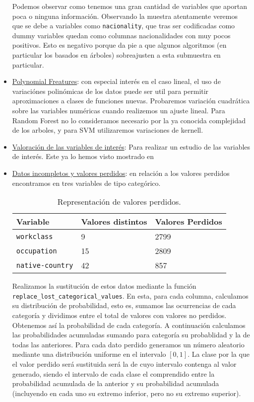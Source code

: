 \documentclass[11pt,a4paper]{article}
\begin{document}
\begin{itemize}
Podemos observar como tenemos una gran cantidad de variables que aportan poca o ninguna información. Observando la muestra atentamente veremos que se debe a variables como \texttt{nacionality}, que tras ser codificadas como dummy variables quedan como columnas nacionalidades con muy pocos positivos. Esto es negativo porque da pie a que algunos algoritmos (en particular los basados en árboles) sobreajusten a esta submuestra en particular. 

\item  \underline{Polynomial Freatures}: con especial interés en el caso lineal, el uso de variaciónes polinómicas de los datos puede ser util para permitir aproximaciones a clases de funciones nuevas. Probaremos variación cuadrática sobre las variables numéricas cuando realizemos un ajuste lineal. Para Random Forest no lo consideramos necesario por la ya conocida complejidad de los arboles, y para SVM utilizaremos variaciones de kernell. \\
	
	\item \underline{Valoración de las variables de interés}: Para realizar un estudio de las variables de interés. Este ya lo hemos visto mostrado en 
	\item \underline{Datos incompletos y valores perdidos}: en relación a los valores perdidos encontramos en tres variables de tipo categórico.\\
	
\begin{table}[h]
\begin{center}
\begin{tabular}{|l|ll|}
\hline
Variable& Valores distintos & Valores Perdidos\\ \hline
\texttt{workclass} & 9 & 2799\\
\texttt{occupation} & 15 & 2809\\
\texttt{native-country} & 42 & 857\\\hline
\end{tabular}
\end{center}
\caption{Representación de valores perdidos.}
	\end{table}
	
	Realizamos la sustitución de estos datos mediante la función \texttt{replace\_lost\_categorical\_values}. En esta, para cada columna, calculamos su distribución de probabilidad, esto es, sumamos las ocurrencias de cada categoría y dividimos entre el total de valores con valores no perdidos. Obtenemos así la probabilidad de cada categoría. A continuación calculamos las probabilidades acumuladas sumando para categoría su probablidad y la de todas las anteriores. Para cada dato perdido generamos un número aleatorio mediante una distribución uniforme en el intervalo $[0,1]$. La clase por la que el valor perdido será sustituida será la de cuyo intervalo contenga al valor generado, siendo el intervalo de cada clase el comprendido entre la probabilidad acumulada de la anterior y su probabilidad acumulada (incluyendo en cada uno su extremo inferior, pero no su extremo superior).
	

\end{itemize}
\end{document}
